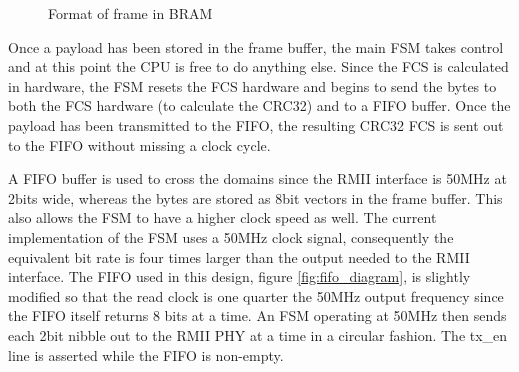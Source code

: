 \begin{figure}[h!]
    \centering
    \caption{Format of frame in BRAM}
    \label{fig:bram_frame_format}
\end{figure}


Once a payload has been stored in the frame buffer, the main FSM takes control and at this point the CPU is free to do anything else. Since the FCS is calculated in hardware, the FSM resets the FCS hardware and begins to send the bytes to both the FCS hardware (to calculate the CRC32) and to a FIFO buffer. Once the payload has been transmitted to the FIFO, the resulting CRC32 FCS is sent out to the FIFO without missing a clock cycle. 

A FIFO buffer is used to cross the domains since the RMII interface is 50MHz at 2bits wide, whereas the bytes are stored as 8bit vectors in the frame buffer. This also allows the FSM to have a higher clock speed as well. The current implementation of the FSM uses a 50MHz clock signal, consequently the equivalent bit rate is four times larger than the output needed to the RMII interface. The FIFO used in this design, figure \ref{fig:fifo_diagram}, is slightly modified so that the read clock is one quarter the 50MHz output frequency since the FIFO itself returns 8 bits at a time. An FSM operating at 50MHz then sends each 2bit nibble out to the RMII PHY at a time in a circular fashion. The tx\_en line is asserted while the FIFO is non-empty.


